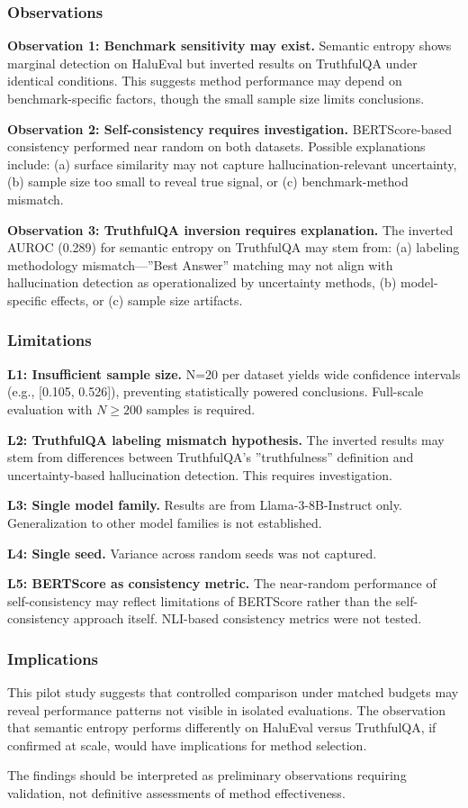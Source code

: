 
\subsubsection{Observations}

\textbf{Observation 1: Benchmark sensitivity may exist.} Semantic entropy shows marginal detection on HaluEval but inverted results on TruthfulQA under identical conditions. This suggests method performance may depend on benchmark-specific factors, though the small sample size limits conclusions.

\textbf{Observation 2: Self-consistency requires investigation.} BERTScore-based consistency performed near random on both datasets. Possible explanations include: (a) surface similarity may not capture hallucination-relevant uncertainty, (b) sample size too small to reveal true signal, or (c) benchmark-method mismatch.

\textbf{Observation 3: TruthfulQA inversion requires explanation.} The inverted AUROC (0.289) for semantic entropy on TruthfulQA may stem from: (a) labeling methodology mismatch---''Best Answer'' matching may not align with hallucination detection as operationalized by uncertainty methods, (b) model-specific effects, or (c) sample size artifacts.

\subsubsection{Limitations}

\textbf{L1: Insufficient sample size.} N=20 per dataset yields wide confidence intervals (e.g., [0.105, 0.526]), preventing statistically powered conclusions. Full-scale evaluation with $N\geq 200$ samples is required.

\textbf{L2: TruthfulQA labeling mismatch hypothesis.} The inverted results may stem from differences between TruthfulQA's ''truthfulness'' definition and uncertainty-based hallucination detection. This requires investigation.

\textbf{L3: Single model family.} Results are from Llama-3-8B-Instruct only. Generalization to other model families is not established.

\textbf{L4: Single seed.} Variance across random seeds was not captured.

\textbf{L5: BERTScore as consistency metric.} The near-random performance of self-consistency may reflect limitations of BERTScore rather than the self-consistency approach itself. NLI-based consistency metrics were not tested.

\subsubsection{Implications}

This pilot study suggests that controlled comparison under matched budgets may reveal performance patterns not visible in isolated evaluations. The observation that semantic entropy performs differently on HaluEval versus TruthfulQA, if confirmed at scale, would have implications for method selection.

The findings should be interpreted as preliminary observations requiring validation, not definitive assessments of method effectiveness.
